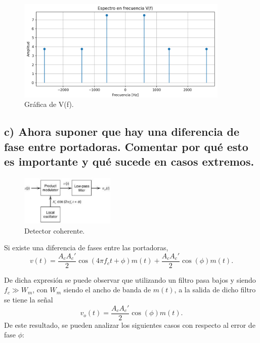 \begin{figure}[H]
        \centering
        \includegraphics[width=0.9\textwidth]{imagenes/Parte_1/Actividad_4/actividad_4b.png}
        \caption{Gráfica de V(f).}
        \label{fig:4b}
    \end{figure}

\subsection*{c) Ahora suponer que hay una diferencia de fase entre portadoras. Comentar por qué esto es importante y qué sucede en casos extremos.}
    
    \begin{figure}[H]
        \centering
        \includegraphics[width=0.4\textwidth]{imagenes/Parte_1/Actividad_2/fig2.png}
        \caption{Detector coherente.}
        \label{fig:2}
    \end{figure}

Si existe una diferencia de fases entre las portadoras, 
\[
v(t) = \frac{A_c A_c'}{2} \cos(4\pi f_c t + \phi)m(t) + \frac{A_c A_c'}{2} \cos(\phi)m(t).
\]

De dicha expresión se puede observar que utilizando un filtro pasa bajos y siendo 
$f_c \gg W_m$, con $W_m$ siendo el ancho de banda de $m(t)$, a la salida de dicho filtro se tiene la señal 
\[
v_o(t) = \frac{A_c A_c'}{2} \cos(\phi)m(t).
\]
De este resultado, se pueden analizar los siguientes casos con respecto al error de fase $\phi$:

